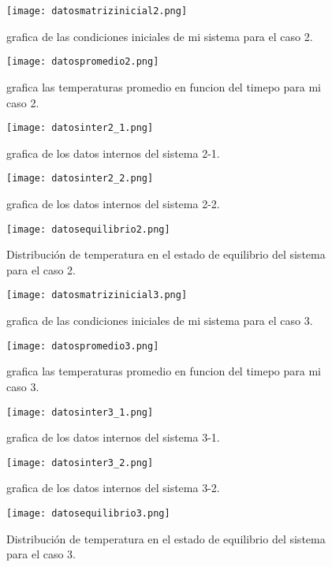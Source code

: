 \documentclass{article}
\begin{document}
\begin{figure}[htb]
	\centering
	\texttt{[image: datosmatrizinicial2.png]}
	\caption{grafica de las condiciones iniciales de mi sistema para el caso 2.}
\end{figure}

\begin{figure}[htb]
	\centering
	\texttt{[image: datospromedio2.png]}
	\caption{grafica las temperaturas promedio en funcion del timepo para mi caso 2.}
\end{figure}

\begin{figure}[htb]
	\centering
	\texttt{[image: datosinter2\_1.png]}
	\caption{grafica de los datos internos del sistema 2-1.}
\end{figure}

\begin{figure}[htb]
	\centering
	\texttt{[image: datosinter2\_2.png]}
	\caption{grafica de los datos internos del sistema 2-2.}
\end{figure}


\begin{figure}[htb]
	\centering
	\texttt{[image: datosequilibrio2.png]}
	\caption{Distribución de temperatura en el estado de equilibrio del sistema para el caso 2.}
\end{figure}





\begin{figure}[htb]
	\centering
	\texttt{[image: datosmatrizinicial3.png]}
	\caption{grafica de las condiciones iniciales de mi sistema para el caso 3.}
\end{figure}

\begin{figure}[htb]
	\centering
	\texttt{[image: datospromedio3.png]}
	\caption{grafica las temperaturas promedio en funcion del timepo para mi caso 3.}
\end{figure}

\begin{figure}[htb]
	\centering
	\texttt{[image: datosinter3\_1.png]}
	\caption{grafica de los datos internos del sistema 3-1.}
\end{figure}

\begin{figure}[htb]
	\centering
	\texttt{[image: datosinter3\_2.png]}
	\caption{grafica de los datos internos del sistema 3-2.}
\end{figure}


\begin{figure}[htb]
	\centering
	\texttt{[image: datosequilibrio3.png]}
	\caption{Distribución de temperatura en el estado de equilibrio del sistema para el caso 3.}
\end{figure}
\end{document}
